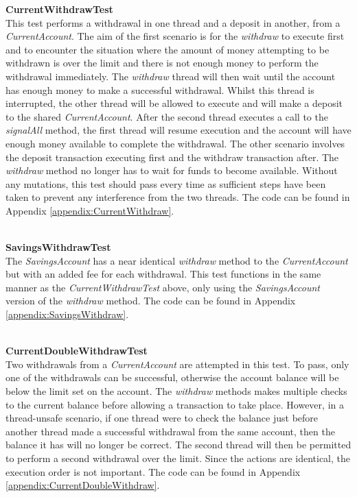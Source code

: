 \documentclass[a4paper,12pt]{article}
\begin{document}
\textbf{CurrentWithdrawTest}
\\This test performs a withdrawal in one thread and a deposit in another, from a \textit{CurrentAccount}. The aim of the first scenario is for the \textit{withdraw} to execute first and to encounter the situation where the amount of money attempting to be withdrawn is over the limit and there is not enough money to perform the withdrawal immediately. The \textit{withdraw} thread will then wait until the account has enough money to make a successful withdrawal. Whilst this thread is interrupted, the other thread will be allowed to execute and will make a deposit to the shared \textit{CurrentAccount}. After the second thread executes a call to the \textit{signalAll} method, the first thread will resume execution and the account will have enough money available to complete the withdrawal. The other scenario involves the deposit transaction executing first and the withdraw transaction after. The \textit{withdraw} method no longer has to wait for funds to become available. Without any mutations, this test should pass every time as sufficient steps have been taken to prevent any interference from the two threads. The code can be found in Appendix \ref{appendix:CurrentWithdraw}.  

\textbf{\\SavingsWithdrawTest}
\\The \textit{SavingsAccount} has a near identical \textit{withdraw} method to the \textit{CurrentAccount} but with an added fee for each withdrawal. This test functions in the same manner as the \textit{CurrentWithdrawTest} above, only using the \textit{SavingsAccount} version of the \textit{withdraw} method. The code can be found in Appendix \ref{appendix:SavingsWithdraw}. 

\textbf{\\CurrentDoubleWithdrawTest}
\\Two withdrawals from a \textit{CurrentAccount} are attempted in this test. To pass, only one of the withdrawals can be successful, otherwise the account balance will be below the limit set on the account. The \textit{withdraw} methods makes multiple checks to the current balance before allowing a transaction to take place. However, in a thread-unsafe scenario, if one thread were to check the balance just before another thread made a successful withdrawal from the same account, then the balance it has will no longer be correct. The second thread will then be permitted to perform a second withdrawal over the limit. Since the actions are identical, the execution order is not important. The code can be found in Appendix \ref{appendix:CurrentDoubleWithdraw}.   
\end{document}
